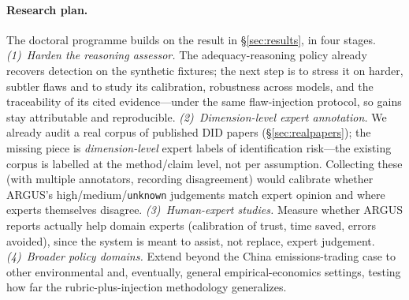 \paragraph{Research plan.}
The doctoral programme builds on the result in \S\ref{sec:results}, in four stages.
\emph{(1)~Harden the reasoning assessor.} The adequacy-reasoning policy already
recovers detection on the synthetic fixtures; the next step is to stress it on
harder, subtler flaws and to study its calibration, robustness across models, and
the traceability of its cited evidence---under the same flaw-injection protocol, so
gains stay attributable and reproducible.
\emph{(2)~Dimension-level expert annotation.} We already audit a real corpus of
published DID papers (\S\ref{sec:realpapers}); the missing piece is
\emph{dimension-level} expert labels of identification risk---the existing
corpus is labelled at the method/claim level, not per assumption. Collecting
these (with multiple annotators, recording disagreement) would calibrate whether
ARGUS's high/medium/\texttt{unknown} judgements match expert opinion and where
experts themselves disagree.
\emph{(3)~Human-expert studies.} Measure whether ARGUS reports actually help
domain experts (calibration of trust, time saved, errors avoided), since the
system is meant to assist, not replace, expert judgement.
\emph{(4)~Broader policy domains.} Extend beyond the China emissions-trading case
to other environmental and, eventually, general empirical-economics settings,
testing how far the rubric-plus-injection methodology generalizes.
